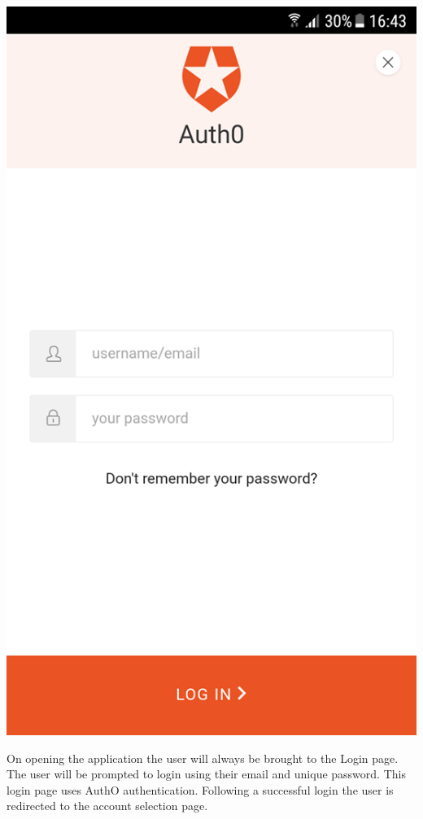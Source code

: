 \begin{center}    
    \includegraphics[scale=0.5]{img/1authloginnull.png}
\end{center} 
On opening the application the user will always be brought to the Login page. The user will be prompted to login using their email and unique password. This login page uses AuthO authentication. Following a successful login the user is redirected to the account selection page.\paragraph{}

